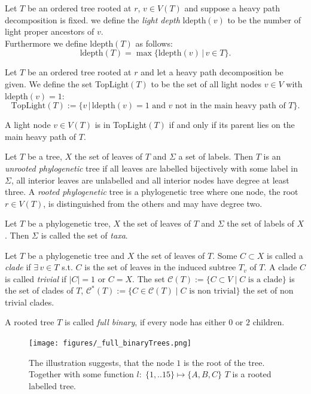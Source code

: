 \begin{defin}
Let $T$ be an ordered tree rooted at $r$, $v \in V(T)$ and suppose a heavy path decomposition is fixed. we define the \textit{light depth} ldepth$(v)$ to be the number of light proper ancestors of $v$.\\
Furthermore we define ldepth$(T)$ as follows:
$$\text{ldepth}(T) = \max \{\text{ldepth}(v) \,|\,v \in T\}.$$
\end{defin}
\begin{defin}
Let $T$ be an ordered tree rooted at $r$ and let a heavy path decomposition be given. We define the set TopLight$(T)$ to be the set of all light nodes $v \in V$ with ldepth$(v) = 1$:
$$\text{TopLight}(T) := \{v \,|\,\text{ldepth}(v)=1 \text{ and } v \text{ not in the main heavy path of }T\}.$$
\end{defin}
\begin{rem}
A light node $v\in V(T)$ is in TopLight$(T)$ if and only if its parent lies on the main heavy path of $T$.
\end{rem}
\begin{defin} Let $T$ be a tree, $X$ the set of leaves of $T$ and $\Sigma$ a set of labels. Then $T$ is an \textit{unrooted phylogenetic} tree if all leaves are labelled bijectively with some label in $\Sigma$, all interior leaves are unlabelled and all interior nodes have degree at least three. A \textit{rooted phylogenetic} tree is a phylogenetic tree where one node, the root $r \in V(T)$, is distinguished from the others and may have degree two.  
\end{defin}
\begin{defin} Let $T$ be a phylogenetic tree, $X$ the set of leaves of $T$ and $\Sigma$ the set of labels of $X$. Then $\Sigma$ is called the set of \textit{taxa}. 
\end{defin}
\begin{defin} Let $T$ be a phylogenetic tree and $X$ the set of leaves of $T$. Some $C \subset X$ is called a \textit{clade} if $\exists \,v \in T$ s.t. $C$ is the set of leaves in the induced subtree $T_v$ of $T$. A clade $C$ is called \textit{trivial} if $|C|=1$ or $C = X$. The set $\mathcal{C}(T) := \{C \subset V\;|\; C\text{ is a clade}\}$ is the set of clades of $T$, $\mathcal{C}^*(T) := \{C \in \mathcal{C}(T)\;|\; C\text{ is non trivial}\}$ the set of non trivial clades.
\end{defin}
\begin{defin} A rooted tree $T$ is called \textit{full binary}, if every node has either $0$ or $2$ children. 
\end{defin}
\begin{rem}

\end{rem}
\begin{figure}[h!]
	\centering
    \texttt{[image: figures/\_full\_binaryTrees.png]}
    \captionsetup{singlelinecheck=off}
    \caption{The illustration suggests, that the node $1$ is the root of the tree. Together with some function $l:\;\{1,..15\} \mapsto \{A,B,C\}$ $T$ is a rooted labelled tree.} 
\end{figure}

